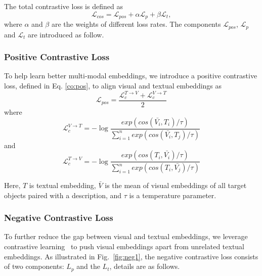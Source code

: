 \documentclass[lettersize,journal]{IEEEtran}
\begin{document}
The total contrastive loss is defined as 
\begin{equation}
\mathcal{L}_{cos}= \mathcal{L}_{pos} + \alpha \mathcal{L}_{p} + \beta \mathcal{L}_{t},
\label{con_pa}
\end{equation}
where $\alpha$ and $\beta$ are the weights of different loss rates. The components $\mathcal{L}_{pos}$, $\mathcal{L}_{p}$ and $\mathcal{L}_{t}$ are introduced as follow. 

\subsubsection{Positive Contrastive Loss}
To help learn better multi-modal embeddings, we introduce a positive contrastive loss, defined in Eq. \textcolor{red}{\ref{co:pos}}, to align visual and textual embeddings as 
\begin{equation}
\mathcal{L}_{pos} = \frac{\mathcal{L}_{c}^{T\to V} + \mathcal{L}_{c}^{V\to T}}{2}
\label{co:pos}
\end{equation}
where 
\begin{equation}
\mathcal{L}_{c}^{V\to T} = -\log{\frac{exp(cos(\bar{V_{i} } ,T_{i} )/\tau )}{ {\textstyle \sum_{i=1}^{n}exp(cos(\bar{V_{i} } ,T_{j} )/\tau )} } }
\label{co:lcvt}
\end{equation}
and
\begin{equation}
\mathcal{L}_{c}^{T\to V} = -\log{\frac{exp(cos(T_{i},\bar{V_{i} } )/\tau )}{ {\textstyle \sum_{i=1}^{n}exp(cos(T_{i},\bar{V_{j} })/\tau )} } }
\label{co:lctv}
\end{equation}

Here, $T$ is textual embedding, $\bar{V}$ is the mean of visual embeddings of all target objects paired with a description, and $\tau$ is a temperature parameter.


\subsubsection{Negative Contrastive Loss}

To further reduce the gap between visual and textual embeddings, we leverage contrastive learning~\cite{contrastive} to push visual embeddings apart from unrelated textual embeddings. 
As illustrated in Fig.~\textcolor{red}{\ref{fig:neg1}}, the negative contrastive loss %
consists of two components: $L_{p}$ and the $L_{t}$, details are as follows.
\end{document}
